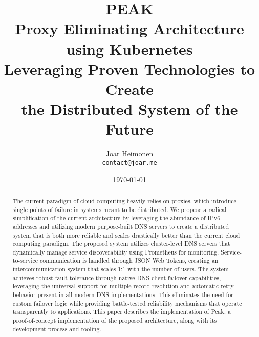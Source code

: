 \documentclass[12pt]{article}
\author{
    Joar Heimonen\\
    \texttt{contact@joar.me}
}
\title{
    \textbf{PEAK}\\[0.5em]
    \large \textbf{P}roxy \textbf{E}liminating \textbf{A}rchitecture using \textbf{K}ubernetes\\[0.3em]
    \large Leveraging Proven Technologies to Create\\
    the Distributed System of the Future
}
\date{\today}
\begin{document}
\maketitle

\begin{abstract}
    \noindent The current paradigm of cloud computing heavily relies on proxies, which introduce single points of failure in systems meant to be distributed. 
    We propose a radical simplification of the current architecture by leveraging the abundance of IPv6 addresses and utilizing modern purpose-built 
    DNS servers to create a distributed system that is both more reliable and scales drastically better than the current cloud computing paradigm. 
    The proposed system utilizes cluster-level DNS servers that dynamically manage service discoverability using Prometheus for monitoring. 
    Service-to-service communication is handled through JSON Web Tokens, creating an intercommunication system that scales 1:1 with the number of users. 
    The system achieves robust fault tolerance through native DNS client failover capabilities, leveraging the universal support for multiple 
    record resolution and automatic retry behavior present in all modern DNS implementations. 
    This eliminates the need for custom failover logic while providing battle-tested reliability mechanisms that operate transparently to applications. 
    This paper describes the implementation of Peak, a proof-of-concept implementation of the proposed architecture, along with its development process and tooling.
\end{abstract}

\pagebreak

\tableofcontents

\pagebreak
\end{document}
